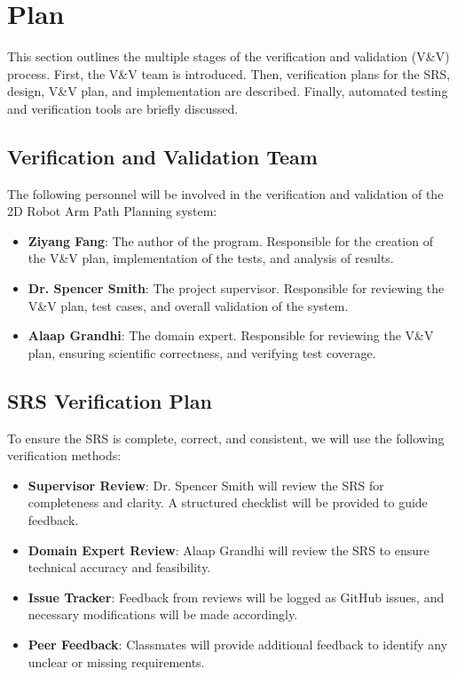 \documentclass[12pt, titlepage]{article}
\begin{document}
\section{Plan}

This section outlines the multiple stages of the verification and validation (V\&V) process. First, the V\&V team is introduced. Then, verification plans for the SRS, design, V\&V plan, and implementation are described. Finally, automated testing and verification tools are briefly discussed.

\subsection{Verification and Validation Team}

The following personnel will be involved in the verification and validation of the 2D Robot Arm Path Planning system:

\begin{itemize}
    \item \textbf{Ziyang Fang}: The author of the program. Responsible for the creation of the V\&V plan, implementation of the tests, and analysis of results.
    \item \textbf{Dr. Spencer Smith}: The project supervisor. Responsible for reviewing the V\&V plan, test cases, and overall validation of the system.
    \item \textbf{Alaap Grandhi}: The domain expert. Responsible for reviewing the V\&V plan, ensuring scientific correctness, and verifying test coverage.
\end{itemize}

\subsection{SRS Verification Plan}

To ensure the SRS is complete, correct, and consistent, we will use the following verification methods:

\begin{itemize}
    \item \textbf{Supervisor Review}: Dr. Spencer Smith will review the SRS for completeness and clarity. A structured checklist will be provided to guide feedback.
    \item \textbf{Domain Expert Review}: Alaap Grandhi will review the SRS to ensure technical accuracy and feasibility.
    \item \textbf{Issue Tracker}: Feedback from reviews will be logged as GitHub issues, and necessary modifications will be made accordingly.
    \item \textbf{Peer Feedback}: Classmates will provide additional feedback to identify any unclear or missing requirements.
\end{itemize}
\end{document}
